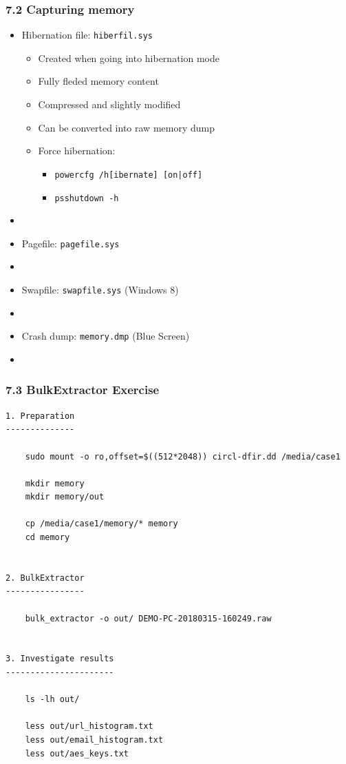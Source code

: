 \begin{frame}
  \frametitle{7.2 Capturing memory}
    \begin{itemize}
        \item Hibernation file: \texttt{hiberfil.sys}
            \begin{itemize}
		    \item[] Created when going into hibernation mode
		    \item[] Fully fleded memory content
		    \item[] Compressed and slightly modified
		    \item[] Can be converted into raw memory dump
		    \item[] Force hibernation:
                    \begin{itemize}
		        \item[] \texttt{powercfg /h[ibernate] [on|off]}
		        \item[] \texttt{psshutdown -h}
                    \end{itemize}
            \end{itemize}
        \item[]
        \item Pagefile: \texttt{pagefile.sys}
        \item[]
	\item Swapfile: \texttt{swapfile.sys} (Windows 8)
        \item[]
	\item Crash dump: \texttt{memory.dmp} (Blue Screen)
        \item[]
    \end{itemize}
\end{frame}


\begin{frame}[fragile]
  \frametitle{7.3 BulkExtractor Exercise}
    \begin{lstlisting}[basicstyle=\tiny]
1. Preparation
--------------

    sudo mount -o ro,offset=$((512*2048)) circl-dfir.dd /media/case1

    mkdir memory
    mkdir memory/out

    cp /media/case1/memory/* memory
    cd memory


2. BulkExtractor
----------------

    bulk_extractor -o out/ DEMO-PC-20180315-160249.raw


3. Investigate results
----------------------

    ls -lh out/

    less out/url_histogram.txt
    less out/email_histogram.txt
    less out/aes_keys.txt
    \end{lstlisting}
\end{frame}


